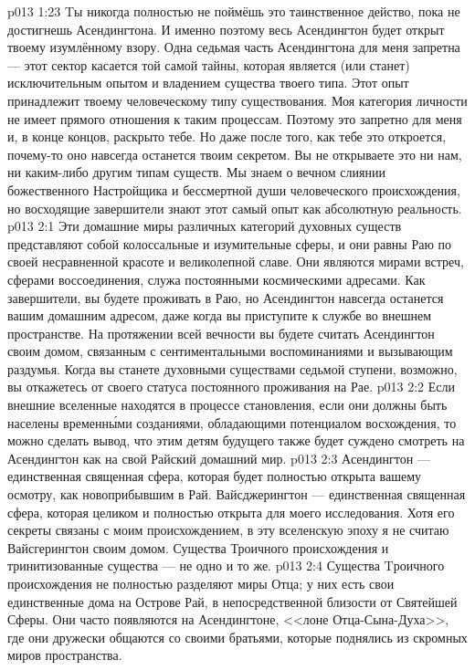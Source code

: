 \vs p013 1:23 Tы никогда полностью не поймёшь это таинственное действо, пока не достигнешь Асендингтона. И именно поэтому весь Асендингтон будет открыт твоему изумлённому взору. Одна седьмая часть Асендингтона для меня запретна --- этот сектор касается той самой тайны, которая является (или станет) исключительным опытом и владением существа твоего типа. Этот опыт принадлежит твоему человеческому типу существования. Моя категория личности не имеет прямого отношения к таким процессам. Поэтому это запретно для меня и, в конце концов, раскрыто тебе. Но даже после того, как тебе это откроется, почему\hyp{}то оно навсегда останется твоим секретом. Вы не открываете это ни нам, ни каким\hyp{}либо другим типам существ. Мы знаем о вечном слиянии божественного Настройщика и бессмертной души человеческого происхождения, но восходящие завершители знают этот самый опыт как абсолютную реальность.
\vs p013 2:1 Эти домашние миры различных категорий духовных существ представляют собой колоссальные и изумительные сферы, и они равны Раю по своей несравненной красоте и великолепной славе. Они являются мирами встреч, сферами воссоединения, служа постоянными космическими адресами. Как завершители, вы будете проживать в Раю, но Асендингтон навсегда останется вашим домашним адресом, даже когда вы приступите к службе во внешнем пространстве. На протяжении всей вечности вы будете считать Асендингтон своим домом, связанным с сентиментальными воспоминаниями и вызывающим раздумья. Когда вы станете духовными существами седьмой ступени, возможно, вы откажетесь от своего статуса постоянного проживания на Рае.
\vs p013 2:2 Если внешние вселенные находятся в процессе становления, если они должны быть населены временн\'ыми созданиями, обладающими потенциалом восхождения, то можно сделать вывод, что этим детям будущего также будет суждено смотреть на Асендингтон как на свой Райский домашний мир.
\vs p013 2:3 \pc Асендингтон --- единственная священная сфера, которая будет полностью открыта вашему осмотру, как новоприбывшим в Рай. Вайсджерингтон --- единственная священная сфера, которая целиком и полностью открыта для моего исследования. Хотя его секреты связаны с моим происхождением, в эту вселенскую эпоху я не считаю Вайсгерингтон своим домом. Существа Троичного происхождения и тринитизованные существа --- не одно и то же.
\vs p013 2:4 \pc Существа Tроичного происхождения не полностью разделяют миры Отца; у них есть свои единственные дома на Острове Рай, в непосредственной близости от Святейшей Сферы. Они часто появляются на Асендингтоне, <<лоне Отца\hyp{}Сына\hyp{}Духа>>, где они дружески общаются со своими братьями, которые поднялись из скромных миров пространства.
